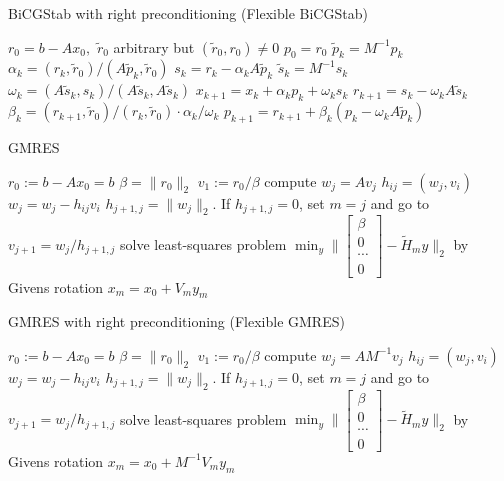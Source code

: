 \documentclass[10pt]{article}
\begin{document}
\begin{algorithm}[H]
  \caption{BiCGStab with right preconditioning (Flexible BiCGStab) \citep{chen2016analysis}}\label{alg:CG}
  \begin{algorithmic}[1]
    \State $r_0=b-Ax_0,$ $\tilde{r}_0$ arbitrary but $(\tilde{r}_0,r_0)\neq 0$
    \State $p_0 = r_0$
    \State $\tilde{p}_k=M^{-1}p_k$
    \State $\alpha_k = (r_k , \tilde{r}_0 )/(A\tilde{p}_k, \tilde{r}_0 )$
    \State $s_k=r_k-\alpha_k A\tilde{p}_k$
    \State $\tilde{s}_k=M^{-1}s_k$
    \State $\omega_k = (A\tilde{s}_k , s_k )/(A\tilde{s}_k,A\tilde{s}_k ) $
    \State $x_{k+1} = x_k + \alpha_k  p_k + \omega_k s_k$
    \State $r_{k+1}=s_k-\omega_k A\tilde{s}_k$
    \State $\beta_k = (r_{k+1},\tilde{r}_0 )/(r_k,\tilde{r}_0 )\cdot \alpha_k/\omega_k$
    \State $p_{k+1}=r_{k+1}+\beta_k(p_k-\omega_k A\tilde{p}_k)$
    \EndFor
  \end{algorithmic}
\end{algorithm}

\begin{algorithm}[H]
  \caption{GMRES \citep[algorithm 6.9]{Saad_2003_IMS}}
  \begin{algorithmic}[1]
    \State $r_0:=b-A x_0=b$
    \State $\beta=\|r_0\|_2$
    \State $v_1:=r_0/\beta$
    \State compute $w_j=Av_j$
        \State $h_{ij}=(w_j,v_i)$
        \State $w_j=w_j-h_{ij} v_i$
        \EndFor
    \State $h_{j+1,j}=\|w_j\|_2$. If $h_{j+1,j}=0$, set $m=j$ and go to
    \State $v_{j+1} = w_j/h_{j+1,j}$
    \State solve least-squares problem $\min_y\|\begin{bmatrix}
    \beta\\
    0\\
    \cdots\\
    0
    \end{bmatrix}- \tilde{H}_m y\|_2$ by Givens rotation
    \EndFor
    \State $x_m = x_0+V_m y_m$
  \end{algorithmic}
\end{algorithm}


\begin{algorithm}[H]
  \caption{GMRES with right preconditioning (Flexible GMRES)\citep[algorithm 9.5]{Saad_2003_IMS}}\label{alg:CG}
  \begin{algorithmic}[1]
    \State $r_0:=b-A x_0=b$
    \State $\beta=\|r_0\|_2$
    \State $v_1:=r_0/\beta$
    \State compute $w_j=AM^{-1}v_j$
        \State $h_{ij}=(w_j,v_i)$
        \State $w_j=w_j-h_{ij} v_i$
        \EndFor
    \State $h_{j+1,j}=\|w_j\|_2$. If $h_{j+1,j}=0$, set $m=j$ and go to
    \State $v_{j+1} = w_j/h_{j+1,j}$
    \State solve least-squares problem $\min_y\|\begin{bmatrix}
    \beta\\
    0\\
    \cdots\\
    0
    \end{bmatrix}- \tilde{H}_m y\|_2$ by Givens rotation
    \EndFor
    \State $x_m = x_0+M^{-1}V_m y_m$
  \end{algorithmic}
\end{algorithm}
\end{document}
